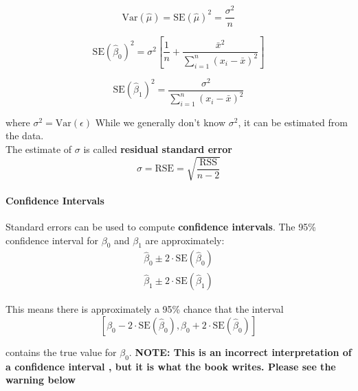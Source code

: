         \begin{equation*}
            \text{Var}(\hat \mu) = \text{SE}(\hat \mu)^2 = \frac{\sigma^2}{n}
        \end{equation*}
        
        
        \begin{equation*}
            \text{SE}(\hat \beta_0)^2 = \sigma^2 \left[ \frac{1}{n} + \frac{\bar x ^2}{\sum_{i=1}^n (x_i - \bar x)^2} \right]
        \end{equation*}
        
        \begin{equation*}
            \text{SE}(\hat \beta_1)^2 = \frac{\sigma^2}{\sum_{i=1}^n (x_i - \bar x)^2}
        \end{equation*}
        
        where \(\sigma^2 = \text{Var}(\epsilon)\) While we generally don't know \(\sigma^2\), it can be estimated from the data.\\
        The estimate of \(\sigma\) is called \textbf{residual standard error}
        \begin{equation*}
            \sigma = \text{RSE} = \sqrt{\frac{\text{RSS}}{n-2}}
        \end{equation*}
        
        \paragraph{Confidence Intervals}
         Standard errors can be used to compute    \textbf{confidence intervals}. The 95\% confidence interval for
        \(\beta_0\) and \(\beta_1\) are approximately: 
        \begin{gather*}
            \hat \beta_0 \pm 2 \cdot \text{SE}(\hat \beta_0)\\
            \hat \beta_1 \pm 2 \cdot \text{SE}(\hat \beta_1)
        \end{gather*}
        
        This means there is approximately a 95\% chance that the interval
        \begin{equation*}
            \left[\beta_0 - 2 \cdot \text{SE}(\hat \beta_0), \beta_0 + 2 \cdot \text{SE}(\hat \beta_0)\right]            
        \end{equation*}
        
        contains the true value for \(\beta_0\). 
        \textbf{NOTE: This is an incorrect interpretation of a confidence interval , but it is what the    book writes. Please see the warning below}
        
